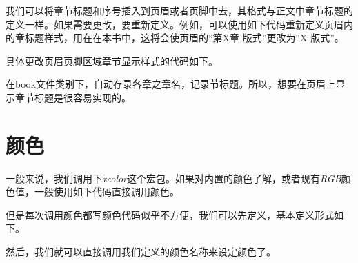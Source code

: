 我们可以将章节标题和序号插入到页眉或者页脚中去，其格式与正文中章节标题的定义一样。如果需要更改，要重新定义。例如，可以使用如下代码重新定义页眉内的章标题样式，用在在本书中，这将会使页眉的“第X章 版式”更改为“X 版式”。 

具体更改页眉页脚区域章节显示样式的代码如下。

\begin{latex}
\renewcommand{\chaptermark}[1]{\markleft{\thesection.\#1}}
\renewcommand{\chaptermark}[1]{\markboth{\thechapter.\ #1}{节样式空置表示修改章样式}}
\renewcommand{\chaptermark}[1]{\markboth{章样式}{节样式}}
\end{latex}

在book文件类别下，\emph{\leftmark}自动存录各章之章名，\emph{\rightmark}记录节标题。所以，想要在页眉上显示章节标题是很容易实现的。

\begin{latex}
\lhead{\leftmark}%
\rhead{\rightmark}%
\end{latex}

\section{颜色}
一般来说，我们调用下\emph{xcolor}这个宏包。如果对内置的颜色了解，或者现有\emph{RGB}颜色值，一般使用如下代码直接调用颜色。

\begin{center}
\color[RGB]{204, 128, 92}{Color Text中文测试}
\end{center}

\begin{latex}
\color[RGB]{204, 128, 92}{Color Text中文测试}
\end{latex}

但是每次调用颜色都写颜色代码似乎不方便，我们可以先定义，基本定义形式如下。
\begin{latex}
\usepackage{xcolor}%
\end{latex}

然后，我们就可以直接调用我们定义的颜色名称来设定颜色了。

\begin{center}
\end{center}

